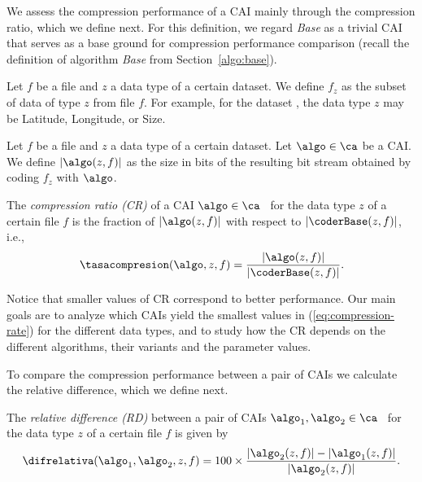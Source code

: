 We assess the compression performance of a CAI mainly through the compression ratio, which we define next. For this definition, we regard \textit{Base} as a trivial CAI that serves as a base ground for compression performance comparison (recall the definition of algorithm \textit{Base} from Section~\ref{algo:base}).


\vspace{+5pt}
\begin{defcion}
Let $f$ be a file and $z$ a data type of a certain dataset. We define $f_z$ as the subset of data of type $z$ from file $f$. For example, for the dataset \datasethail, the data type $z$ may be Latitude, Longitude, or Size.
\end{defcion}


\vspace{+2pt}
\begin{defcion}
\label{eq:coding-size}
Let $f$ be a file and $z$ a data type of a certain dataset. Let $\algo \in \ca$ be a CAI. We define $|\algo(z, f)|$ as the size in bits of the resulting bit stream obtained by coding $f_z$ with $\algo$.
\end{defcion}


\vspace{+2pt}
\begin{defcion}
\label{def:compression-rate}
The \textit{compression ratio (CR)} of a CAI $\algo \in \ca$ \ for the data type $z$ of a certain file $f$ is the fraction of $|\algo(z, f)|$ with respect to $|\coderBase(z, f)|$, i.e.,
\vspace{-5pt}
\begin{equation}
\label{eq:compression-rate}
\tasacompresion(\algo, z, f) = \frac{|\algo(z, f)|}{|\coderBase(z, f)|}.
\end{equation}
\end{defcion}


Notice that smaller values of CR correspond to better performance. Our main goals are to analyze which CAIs yield the smallest values in (\ref{eq:compression-rate}) for the different data types, and to study how the CR depends on the different algorithms, their variants and the parameter values.


\clearpage


To compare the compression performance between a pair of CAIs we calculate the relative difference, which we define next.


\vspace{+5pt}
\begin{defcion}
\label{relative-difference}
The \textit{relative difference (RD)} between a pair of CAIs $\algo_1, \algo_2 \in {\ca}$ \ for the data type $z$ of a certain file $f$ is given by
\vspace{-5pt}
\begin{equation}
\label{eq:relative-difference}
\difrelativa(\algo_1, \algo_2, z, f)  =
100\times\frac{|\algo_2 (z, f)| - |\algo_1 (z, f)|}{ |\algo_2 (z, f)| }.
\end{equation}
\end{defcion}


